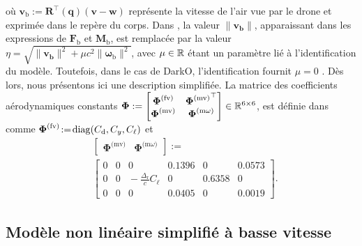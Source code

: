 où $\boldsymbol{v}_{\text{b}} := \boldsymbol{R}^\top(\boldsymbol{q}) (\boldsymbol{v}-\boldsymbol{w})$ représente la vitesse de l'air vue par le drone et exprimée dans le repère du corps. Dans \cite{lustosaHal-03035938}, la valeur $\lVert \boldsymbol{v_{\text{b}}} \rVert$, apparaissant dans les expressions de  $\boldsymbol{F}_{\text{b}}$ et $\boldsymbol{M}_{\text{b}}$, est remplacée par la valeur $\eta = \sqrt{\lVert \boldsymbol{v_{\text{b}}} \rVert^{2} + \mu c^{2} \lVert \boldsymbol{\omega}_{\text{b}} \rVert^{2}}$, avec $\mu \in {\mathbb R}$ étant un paramètre lié à l'identification du modèle. Toutefois, dans le cas de DarkO, l'identification fournit $\mu = 0$ \cite{sansouStage}. Dès lors, nous présentons ici une description simplifiée. La matrice des coefficients aérodynamiques constants 
$\boldsymbol{\Phi}:= \begin{bmatrix} \boldsymbol{\Phi}^{\text{(fv)}} & {\boldsymbol{\Phi}^{\text{(mv)}}}^\top \\ \boldsymbol{\Phi}^{\text{(mv)}} & \boldsymbol{\Phi}^{\text{(m$\omega$)}} \end{bmatrix} \in {\mathbb R}^{6 \times 6}$, est définie dans \cite[eqs. (6)--(9)]{olszaneckibarthHal-02542982} comme $ \boldsymbol{\Phi}^{\text{(fv)}} \!:=\! \operatorname{diag}(C_{\text{d}},C_{y}, C_{\ell})$ et
\begin{align*}
&\left[ \begin{array}{c|c}
    \boldsymbol{\Phi}^{\text{(mv)}}  &  \boldsymbol{\Phi}^{\text{(m$\omega$)}} 
\end{array}\right] :=\\ 
&\left[ \begin{array}{ccc|ccc}
    0 & 0 & 0    &                                          0.1396 & 0 & 0.0573 \\
    0 & 0 & \!\!\!\!\! -\frac{\Delta_{\text{r}}}{c}C_{\ell} &    0 &  0.6358  & 0 \\
    0 & 0 & 0 &     0.0405 & 0 & 0.0019 
\end{array}\right].
\end{align*}


\subsection{Modèle non linéaire simplifié à basse vitesse}
\label{sec:model_NL_simp}

